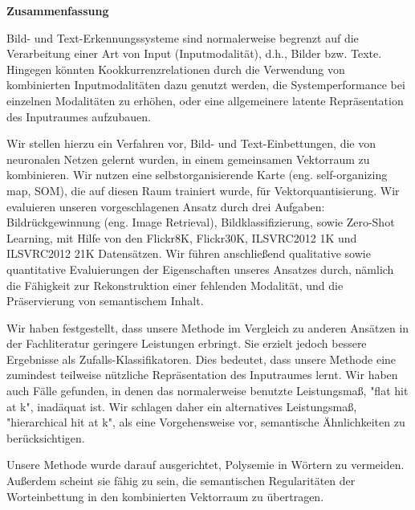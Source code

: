 \documentclass[a4paper]{standalone}
\begin{document}
    
\thispagestyle{empty}
\vspace*{1.0cm}

\begin{center}
    \textbf{Zusammenfassung}
\end{center}

\vspace*{0.5cm}

\noindent

Bild- und Text-Erkennungssysteme sind normalerweise begrenzt auf die Verarbeitung einer Art von Input (Inputmodalität), d.h., Bilder bzw. Texte.
Hingegen könnten Kookkurrenzrelationen durch die Verwendung von kombinierten Inputmodalitäten dazu genutzt werden, die Systemperformance bei einzelnen Modalitäten zu erhöhen, oder eine allgemeinere latente Repräsentation des Inputraumes aufzubauen.

Wir stellen hierzu ein Verfahren vor, Bild- und Text-Einbettungen, die von neuronalen Netzen gelernt wurden, in einem gemeinsamen Vektorraum zu kombinieren.
Wir nutzen eine selbstorganisierende Karte (eng. self-organizing map, SOM), die auf diesen Raum trainiert wurde, für Vektorquantisierung. Wir evaluieren unseren vorgeschlagenen Ansatz durch drei Aufgaben: Bildrückgewinnung (eng. Image Retrieval), Bildklassifizierung, sowie Zero-Shot Learning, mit Hilfe von den Flickr8K, Flickr30K, ILSVRC2012 1K und ILSVRC2012 21K Datensätzen.
Wir führen anschließend qualitative sowie quantitative Evaluierungen der Eigenschaften unseres Ansatzes durch, nämlich die Fähigkeit zur Rekonstruktion einer fehlenden Modalität, und die Präservierung von semantischem Inhalt.

Wir haben festgestellt, dass unsere Methode im Vergleich zu anderen Ansätzen in der Fachliteratur geringere Leistungen erbringt. Sie erzielt jedoch bessere Ergebnisse als Zufalls-Klassifikatoren. Dies bedeutet, dass unsere Methode eine zumindest teilweise nützliche Repräsentation des Inputraumes lernt.
Wir haben auch Fälle gefunden, in denen das normalerweise benutzte Leistungsmaß, "flat hit at k", inadäquat ist. Wir schlagen daher ein alternatives Leistungsmaß, "hierarchical hit at k", als eine Vorgehensweise vor, semantische Ähnlichkeiten zu berücksichtigen.

Unsere Methode wurde darauf ausgerichtet, Polysemie in Wörtern zu vermeiden. Außerdem scheint sie fähig zu sein, die semantischen Regularitäten der Worteinbettung in den kombinierten Vektorraum zu übertragen.
\end{document}
